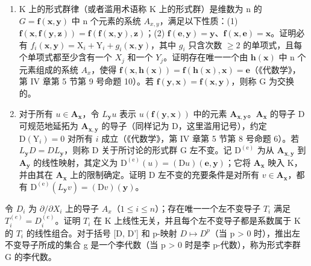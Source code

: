 \begin{enumerate}
\def\labelenumi{(\alph{enumi})}
\item
  K 上的形式群律（或者滥用术语称 K 上的形式群）是维数为 n 的 \(G = \mathbf{f}(\mathbf{x}, \mathbf{y})\) 中 n 个元素的系统 \(A_{x,y}\)，满足以下性质：(1) \(\mathbf{f}(\mathbf{x}, \mathbf{f}(\mathbf{y}, \mathbf{z})) = \mathbf{f}(\mathbf{f}(\mathbf{x}, \mathbf{y}), \mathbf{z})\)；(2) \(\mathbf{f}(\mathbf{e}, \mathbf{y}) = \mathbf{y}\)、\(\mathbf{f}(\mathbf{x}, \mathbf{e}) = \mathbf{x}\)。证明必有 \(f_{i}(\mathbf{x}, \mathbf{y}) = \mathrm{X}_{i} + \mathrm{Y}_{i} + g_{i}(\mathbf{x}, \mathbf{y})\)，其中 \(g_{i}\) 只含次数 \(\geqslant 2\) 的单项式，且每个单项式都至少含有一个 \(X_{j}\) 和一个 \(Y_{j}\)。证明存在唯一一个由 \(\mathbf{h}(\mathbf{x})\) 中 n 个元素组成的系统 \(A_{x}\)，使得 \(\mathbf{f}(\mathbf{x}, \mathbf{h}(\mathbf{x})) = \mathbf{f}(\mathbf{h}(\mathbf{x}), \mathbf{x}) = \mathbf{e}\)（《代数学》，第 IV 章第 5 节第 9 号命题 10）。若 \(\mathbf{f}(\mathbf{y}, \mathbf{x}) = \mathbf{f}(\mathbf{x}, \mathbf{y})\)，则称 G 为交换的。
\item
对于所有 \(u \in \mathbf{A}_{\mathbf{x}}\)，令 \(L_{\mathbf{y}}u\) 表示 \(u(\mathbf{f}(\mathbf{y},\mathbf{x}))\) 中的元素 \(\mathbf{A}_{\mathbf{x},\mathbf{y}}\)。\(\mathbf{A}_{\mathbf{x}}\) 的导子 D 可规范地延拓为 \(\mathbf{A}_{\mathbf{x},\mathbf{y}}\) 的导子（同样记为 D，这里滥用记号），约定 \(\mathrm{D}(\mathrm{Y}_i) = 0\) 对所有 \(i\) 成立（《代数学》，第 IV 章第 5 节第 8 号命题 6）。若 \(L_{\mathbf{y}}D = DL_{\mathbf{y}}\)，则称 D 关于所讨论的形式群 G 左不变。记 \(\mathrm{D}^{(\mathrm{e})}\) 为从 \(\mathbf{A}_{\mathbf{x},\mathbf{y}}\) 到 \(\mathbf{A}_{\mathbf{y}}\) 的线性映射，其定义为 \(\mathrm{D}^{(\mathrm{e})}(u) = (\mathrm{D}u)(\mathbf{e},\mathbf{y})\)；它将 \(\mathbf{A}_{\mathbf{x}}\) 映入 K，并由其在 \(\mathbf{A}_{\mathbf{x}}\) 上的限制确定。证明 D 左不变的充要条件是对所有 \(v \in \mathbf{A}_{\mathbf{x}}\)，都有 \(\mathrm{D}^{(\mathrm{e})}(L_{\mathbf{y}}v) = (\mathrm{D}v)(\mathbf{y})\)。
\end{enumerate}

令 \(D_{i}\) 为 \(\partial/\partial X_{i}\) 上的导子 \(A_{x}\)（\(1 \leqslant i \leqslant n\)）；存在唯一一个左不变导子 \(T_{i}\) 满足 \(T_{i}^{(e)} = D_{i}^{(e)}\)。证明 \(T_{i}\) 在 K 上线性无关，并且每个左不变导子都是系数属于 K 的 \(T_{i}\) 的线性组合。对于括号 {[}D, D'{]} 和 p-映射 \(D \mapsto D^{p}\)（当 p \textgreater{} 0 时），推出左不变导子所成的集合 g 是一个李代数（当 p \textgreater{} 0 时是李 p-代数），称为形式李群 G 的李代数。

